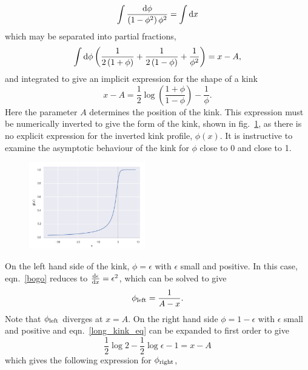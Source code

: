 \documentclass[11pt, oneside]{article}  	%
\numberwithin{equation}{section}
\newcommand{\drv}{\ensuremath{\textup{d}}}
\begin{document}
\begin{equation}
    \int \frac{\drv\phi}{\left(1-\phi^2 \right ) \phi^2} = \int \drv x
\end{equation}
which may be separated into partial fractions,
\begin{equation}
    \int\drv\phi \left (\frac{1}{2\left(1+\phi\right )} + \frac{1}{2\left(1-\phi\right )} + \frac{1}{\phi^2} \right) = x -A,
\end{equation}
and integrated to give an implicit expression for the shape of a kink
\begin{equation}\label{long_kink_eq}
    x-A = \frac{1}{2}\log\left (\frac{1+\phi}{1-\phi} \right ) - \frac{1}{\phi}.
\end{equation}
Here the parameter $A$ determines the position of the kink. This expression must be numerically inverted to give the form of the kink, shown in fig.~\ref{phi8kink}, as there is no explicit expression for the inverted kink profile, $\phi(x)$. It is instructive to examine the asymptotic behaviour of the kink for $\phi$ close to 0 and close to 1. \par
\begin{figure}[t]
    \centering
        \includegraphics[width=0.45\textwidth]{phi8_kink.png} 
     \label{phi8kink}
\end{figure}
On the left hand side of the kink, $\phi = \epsilon$ with $\epsilon$ small and positive. In this case, eqn.~\ref{bogo} reduces to $\frac{\drv \epsilon}{\drv x} = \epsilon^2$, which can be solved to give 
\begin{equation}
    \phi_\textup{left} = \frac{1}{A-x}.
\end{equation}
Note that $\phi_\textup{left}$ diverges at $x = A$. On the right hand side $\phi = 1- \epsilon$ with $\epsilon$ small and positive and eqn.~\ref{long_kink_eq} can be expanded to first order to give
\begin{equation}
    \frac{1}{2} \log2 - \frac{1}{2} \log \epsilon - 1 = x-A
\end{equation}
which gives the following expression for $\phi_{\textup{right}}$,
\end{document}

